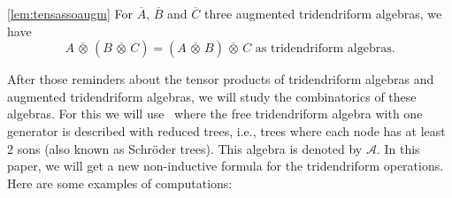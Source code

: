 \documentclass[10pt,a4paper]{amsart}
\numberwithin{equation}{section}
\theoremstyle{definition}
\theoremstyle{plain}
\begin{document}
\begin{customlemma}{\ref{lem:tensassoaugm}}
	For $\overline{A}$, $\overline{B}$ and $\overline{C}$ three augmented tridendriform algebras, we have
	\[
	A\,\overline{\otimes}\, (B\,\overline{\otimes} \,C)=(A\, \overline{\otimes}\,B)\, \overline{\otimes}\,C \text{ as tridendriform algebras.}
	\]
\end{customlemma}

After those reminders about the tensor products of tridendriform algebras and augmented tridendriform algebras, we will study the combinatorics of these algebras.
For this we will use~\cite{Trial} where the free tridendriform algebra with one generator is described with reduced trees, i.e., trees where each node has at least $2$ sons (also known as Schr\"oder trees). This algebra is denoted by $\mathcal{A}$. In this paper, we will get a new non-inductive formula for the tridendriform operations. Here are some examples of computations:
\end{document}
